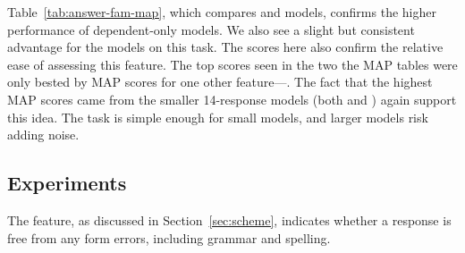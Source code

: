 Table~\ref{tab:answer-fam-map}, which compares  and  models, confirms the higher performance of dependent-only models. We also see a slight but consistent advantage for the  models on this task.
The scores here also confirm the relative ease of assessing this feature. The top scores seen in the two the  MAP tables were only bested by MAP scores for one other feature---. The fact that the highest  MAP scores came from the smaller 14-response models (both  and ) again support this idea. The task is simple enough for small models, and larger models risk adding noise.


\subsection{ Experiments}
\label{sec:map-gramm}

The  feature, as discussed in Section~\ref{sec:scheme}, indicates whether a response is free from any form errors, including grammar and spelling. 

